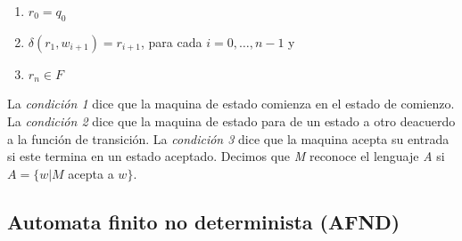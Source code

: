 \documentclass{article}
\begin{document}
\begin{enumerate}
    \item \(r_0=q_0\)
    \item \(\delta(r_1, w_{i+1})=r_{i+1}\), para cada \(i=0,\dots,n-1\) y
    \item \(r_n \in F\)
\end{enumerate}

La \textit{condición 1} dice que la maquina de estado comienza en el estado de comienzo. La \textit{condición 2} dice que la maquina de estado para de un estado a otro deacuerdo a la función de transición.
La \textit{condición 3} dice que la maquina acepta su entrada si este termina en un estado aceptado. 
Decimos que \textit{M} reconoce el lenguaje \textit{A} si \(A=\{w | M\) acepta a \(w \}\).


\subsection{Automata finito no determinista (AFND)}
\end{document}
